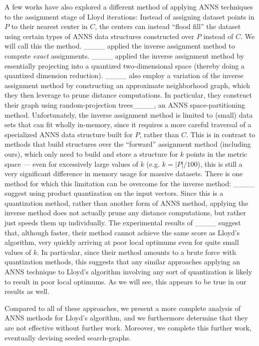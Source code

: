 A few works have also explored a different method of applying ANNS techniques
to the assignment stage of Lloyd iterations:
Instead of assigning dataset points in $P$ to their nearest center in $C$,
the centers can instead ``flood fill'' the dataset
using certain types of ANNS data structures
constructed over $P$ instead of $C$.
We will call this the  method.
____ applied the inverse assignment method
to compute \emph{exact} assignments.
____
applied the inverse assignment method
by essentially projecting into a quantized two-dimensional
space (thereby doing a quantized dimension reduction).
____
also employ a variation of the inverse assignment method
by constructing an approximate neighborhood graph,
which they then leverage to prune distance computations.
In particular, they construct their graph
using
random-projection trees____,
an ANNS space-partitioning method.
Unfortunately,
the inverse assignment method is limited to
(small) data sets that can fit wholly in-memory,
since it requires a more careful traversal of
a specialized ANNS data structure built for $P$, rather than $C$.
This is in contrast to methods that build structures
over the
``forward'' assignment method
(including ours),
which only need to build and store a structure
for $k$ points in the metric space ---
even for excessively large values of $k$ (e.g. $k=|P|/100$),
this is still a very significant difference
in memory usage for massive datasets.
There is one method for which this limitation can
be overcome for the inverse method:
____ suggest
using product quantization
on the input vectors.
Since this is a quantization method,
rather than another form of ANNS method,
applying the inverse method
does not actually prune any distance computations,
but rather just speeds them up individually.
The experimental results of ____
suggest that, although faster,
their method cannot achieve the same score
as Lloyd's algorithm,
very quickly arriving at poor local optimums even for quite small values of $k$.
In particular,
since their method amounts to a brute force
with quantization methods,
this suggests that any similar approaches
applying an ANNS technique to Lloyd's algorithm
involving any sort of quantization is likely to result
in poor local optimums.
As we will see, this appears
to be true in our results as well.

Compared to all of these approaches,
we present a more complete analysis
of ANNS methods
for Lloyd's algorithm,
and we furthermore determine that they
are not effective without further work.
Moreover, we complete this further work,
eventually devising seeded search-graphs.


